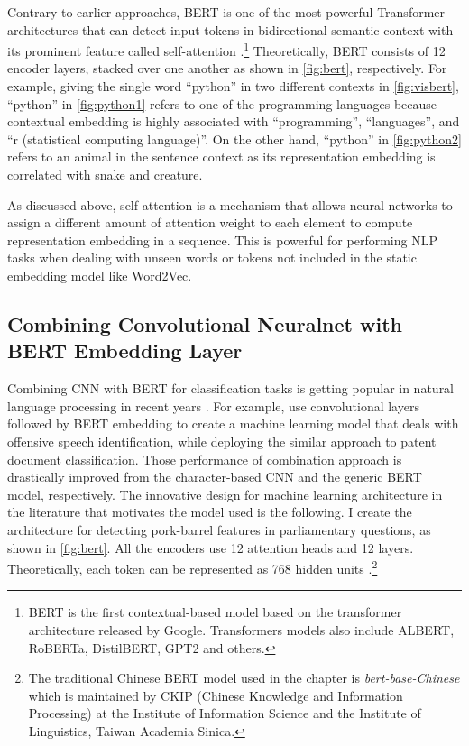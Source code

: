 Contrary to earlier approaches, BERT is one of the most powerful Transformer architectures that can detect input tokens in bidirectional semantic context with its prominent feature called self-attention \citep{Devlin2019, Vaswani2017}.\footnote{BERT is the first contextual-based model based on the transformer architecture released by Google.  Transformers models also include ALBERT, RoBERTa, DistilBERT, GPT2 and others.} Theoretically, BERT consists of 12 encoder layers, stacked over one another as shown in \autoref{fig:bert}, respectively. For example, giving the single word ``python'' in two different contexts in \autoref{fig:visbert},  ``python'' in \autoref{fig:python1} refers to one of the programming languages because contextual embedding is highly associated with ``programming'', ``languages'', and ``r (statistical computing language)''. On the other hand, ``python'' in \autoref{fig:python2} refers to an animal in the sentence context as its representation embedding is correlated with snake and creature.

As discussed above, self-attention is a mechanism that allows neural networks to assign a different amount of attention weight to each element to compute representation embedding in a sequence. This is powerful for performing NLP tasks when dealing with unseen words or tokens not included in the static embedding model like Word2Vec.   



\subsection*{Combining Convolutional Neuralnet with BERT Embedding Layer}
Combining CNN with BERT for classification tasks is getting popular in natural language processing in recent years \citep{Safaya2020, Lu2019, Lopez2017}. For example, \citet{Safaya2020} use convolutional layers followed by BERT embedding to create a machine learning model that deals with offensive speech identification, while \citet{Lu2019} deploying the similar approach to patent document classification. Those performance of combination approach is drastically improved from the character-based CNN and the generic BERT model, respectively. The innovative design for machine learning architecture in the literature that motivates the model used is the following. I create the architecture for detecting pork-barrel features in parliamentary questions, as shown in \autoref{fig:bert}. All the encoders use 12 attention heads and 12 layers. Theoretically, each token can be represented as 768 hidden units \citep[][]{Wolf2020}.\footnote{The traditional Chinese BERT model used in the chapter is \textit{bert-base-Chinese} which is maintained by CKIP (Chinese Knowledge and Information Processing) at the Institute of Information Science and the Institute of Linguistics, Taiwan Academia Sinica.} 

